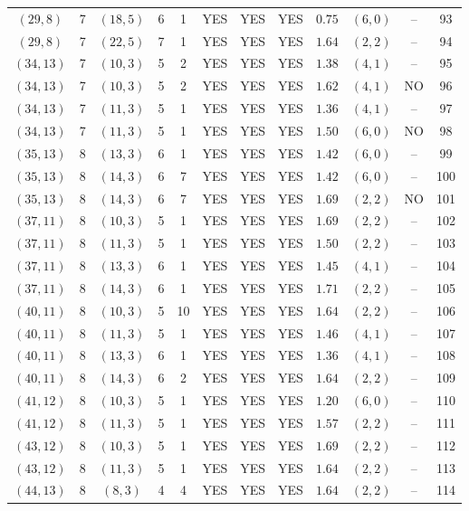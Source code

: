 \begin{longtable}{|c|c|c|c|c|c|c|c|c|c|c|c|}
$(29,8)$ & 7 & $(18,5)$ & 6 & 1 & YES & YES & YES & $0.75$ & $(6,0)$ & -- & 93\\
$(29,8)$ & 7 & $(22,5)$ & 7 & 1 & YES & YES & YES & $1.64$ & $(2,2)$ & -- & 94\\
$(34,13)$ & 7 & $(10,3)$ & 5 & 2 & YES & YES & YES & $1.38$ & $(4,1)$ & -- & 95\\
$(34,13)$ & 7 & $(10,3)$ & 5 & 2 & YES & YES & YES & $1.62$ & $(4,1)$ & NO & 96\\
$(34,13)$ & 7 & $(11,3)$ & 5 & 1 & YES & YES & YES & $1.36$ & $(4,1)$ & -- & 97\\
$(34,13)$ & 7 & $(11,3)$ & 5 & 1 & YES & YES & YES & $1.50$ & $(6,0)$ & NO & 98\\
$(35,13)$ & 8 & $(13,3)$ & 6 & 1 & YES & YES & YES & $1.42$ & $(6,0)$ & -- & 99\\
$(35,13)$ & 8 & $(14,3)$ & 6 & 7 & YES & YES & YES & $1.42$ & $(6,0)$ & -- & 100\\
$(35,13)$ & 8 & $(14,3)$ & 6 & 7 & YES & YES & YES & $1.69$ & $(2,2)$ & NO & 101\\
$(37,11)$ & 8 & $(10,3)$ & 5 & 1 & YES & YES & YES & $1.69$ & $(2,2)$ & -- & 102\\
$(37,11)$ & 8 & $(11,3)$ & 5 & 1 & YES & YES & YES & $1.50$ & $(2,2)$ & -- & 103\\
$(37,11)$ & 8 & $(13,3)$ & 6 & 1 & YES & YES & YES & $1.45$ & $(4,1)$ & -- & 104\\
$(37,11)$ & 8 & $(14,3)$ & 6 & 1 & YES & YES & YES & $1.71$ & $(2,2)$ & -- & 105\\
$(40,11)$ & 8 & $(10,3)$ & 5 & 10 & YES & YES & YES & $1.64$ & $(2,2)$ & -- & 106\\
$(40,11)$ & 8 & $(11,3)$ & 5 & 1 & YES & YES & YES & $1.46$ & $(4,1)$ & -- & 107\\
$(40,11)$ & 8 & $(13,3)$ & 6 & 1 & YES & YES & YES & $1.36$ & $(4,1)$ & -- & 108\\
$(40,11)$ & 8 & $(14,3)$ & 6 & 2 & YES & YES & YES & $1.64$ & $(2,2)$ & -- & 109\\
$(41,12)$ & 8 & $(10,3)$ & 5 & 1 & YES & YES & YES & $1.20$ & $(6,0)$ & -- & 110\\
$(41,12)$ & 8 & $(11,3)$ & 5 & 1 & YES & YES & YES & $1.57$ & $(2,2)$ & -- & 111\\
$(43,12)$ & 8 & $(10,3)$ & 5 & 1 & YES & YES & YES & $1.69$ & $(2,2)$ & -- & 112\\
$(43,12)$ & 8 & $(11,3)$ & 5 & 1 & YES & YES & YES & $1.64$ & $(2,2)$ & -- & 113\\
$(44,13)$ & 8 & $(8,3)$ & 4 & 4 & YES & YES & YES & $1.64$ & $(2,2)$ & -- & 114\\

\end{longtable}
